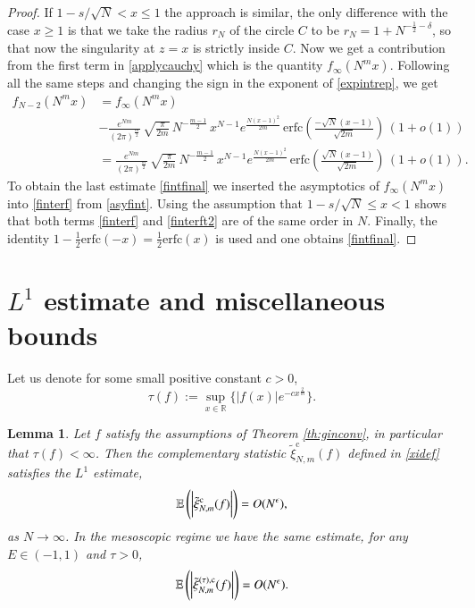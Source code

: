 \documentclass[11pt,reqno]{amsproc}
\newtheorem{lemma}[theorem]{Lemma}
\numberwithin{equation}{section}
\numberwithin{theorem}{section}
\begin{document}
\begin{proof}
If $1-s/\sqrt{N} < x\leq1$ the approach is similar, the only difference with the case $x \geq 1$ is that we take the radius $r_{N}$ of the circle $C$ to be $r_{N} = 1+N^{-\frac{1}{2}-\delta}$, so that now the singularity at $z=x$ is strictly inside $C$. Now we get a contribution from the first term in \eqref{applycauchy} which is the quantity $f_{\infty}(N^{m}x)$. Following all the same steps and changing the sign in the exponent of \eqref{expintrep}, we get 
\begin{align}
f_{N-2}(N^{m}x) &= f_{\infty}(N^{m}x) \label{finterf}\\
&-\frac{e^{Nm}}{(2\pi)^{\frac{m}{2}}}\,\sqrt{\frac{\pi}{2m}}\,N^{-\frac{m-1}{2}}\,x^{N-1}e^{\frac{N(x-1)^{2}}{2m}}\,\mathrm{erfc}\left(\frac{-\sqrt{N}(x-1)}{\sqrt{2m}}\right)\,(1+o(1)) \label{finterft2}\\
&= \frac{e^{Nm}}{(2\pi)^{\frac{m}{2}}}\,\sqrt{\frac{\pi}{2m}}\,N^{-\frac{m-1}{2}}\,x^{N-1}e^{\frac{N(x-1)^{2}}{2m}}\,\mathrm{erfc}\left(\frac{\sqrt{N}(x-1)}{\sqrt{2m}}\right)\,(1+o(1)) \label{fintfinal}.
\end{align}
To obtain the last estimate \eqref{fintfinal} we inserted the asymptotics of $f_{\infty}(N^{m}x)$ into \eqref{finterf} from \eqref{asyfint}. Using the assumption that $1-s/\sqrt{N} \leq x < 1$ shows that both terms \eqref{finterf} and \eqref{finterft2} are of the same order in $N$. Finally, the identity $1-\frac{1}{2}\mathrm{erfc}(-x) = \frac{1}{2}\mathrm{erfc}(x)$ is used and one obtains \eqref{fintfinal}.
\end{proof}

\section{$L^{1}$ estimate and miscellaneous bounds}
\label{se:truncation}
Let us denote for some small positive constant $c>0$,
\begin{equation}
\tau(f) := \sup_{x \in \mathbb{R}}\bigg\{\lvert f(x) \rvert e^{-cx^{\frac{2}{m}}}\bigg\}.
\end{equation}
\begin{lemma}
\label{le:l1est}
Let $f$ satisfy the assumptions of Theorem \ref{th:ginconv}, in particular that $\tau(f) < \infty$. Then the complementary statistic $\tilde{\xi}^{\mathrm{c}}_{N,m}(f)$ defined in \eqref{xidef} satisfies the $L^{1}$ estimate,
\begin{equation}
\mathbb{E}\left(\bigg{|}\tilde{\xi}^{\mathrm{c}}_{N,m}(f)\bigg{|}\right) = O(N^{\epsilon}), \label{l1est}
\end{equation}
as $N \to \infty$. In the mesoscopic regime we have the same estimate, for any $E \in (-1,1)$ and $\tau>0$,
\begin{equation}
\mathbb{E}\left(\bigg{|}\tilde{\xi}^{(\tau),\mathrm{c}}_{N,m}(f)\bigg{|}\right) = O(N^{\epsilon}). \label{l1estmeso}
\end{equation}
\end{lemma}
\end{document}
